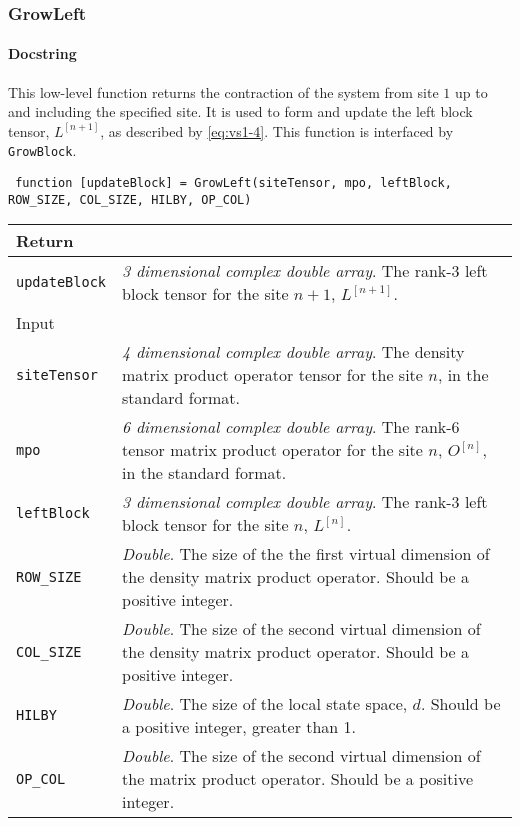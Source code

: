  \subsubsection{GrowLeft}
 \paragraph{Docstring} This low-level function returns the contraction of the system from site \(1\) up to and including the specified site. It is used to form and update the left block tensor, \(L^{[n+1]}\), as described by \cref{eq:vs1-4}. This function is interfaced by \lstinline$GrowBlock$.
 \begin{lstlisting}
 function [updateBlock] = GrowLeft(siteTensor, mpo, leftBlock, ROW_SIZE, COL_SIZE, HILBY, OP_COL) \end{lstlisting}
 \begin{longtabu}{X[1,l]X[4,l]}
 \hline
 Return & \\ \hline
 \lstinline$updateBlock$ & \emph{3 dimensional complex double array}. The rank-3 left block tensor for the site \(n + 1\), \(L^{[n+1]}\). \\ \hline
 Input & \\ \hline
 \lstinline$siteTensor$ & \emph{4 dimensional complex double array}. The density matrix product operator tensor for the site \(n\), in the standard format. \\
 \lstinline$mpo$ & \emph{6 dimensional complex double array}. The rank-6 tensor matrix product operator for the site \(n\), \(O^{[n]}\), in the standard format. \\
 \lstinline$leftBlock$ & \emph{3 dimensional complex double array}. The rank-3 left block tensor for the site \(n\), \(L^{[n]}\). \\
 \lstinline$ROW_SIZE$ & \emph{Double}. The size of the the first virtual dimension of the density matrix product operator. Should be a positive integer. \\
 \lstinline$COL_SIZE$ & \emph{Double}. The size of the second virtual dimension of the density matrix product operator. Should be a positive integer. \\ 
 \lstinline$HILBY$ & \emph{Double}. The size of the local state space, \(d\). Should be a positive integer, greater than 1. \\
 \lstinline$OP_COL$ & \emph{Double}. The size of the second virtual dimension of the matrix product operator. Should be a positive integer. \\
 \hline
 \end{longtabu}
